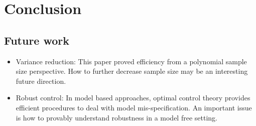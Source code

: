 \section{Conclusion}
\label{section:conclusion}
\subsection{Future work}
\begin{itemize}
    \item Variance reduction: This paper proved efficiency from a polynomial sample size perspective. How to further decrease sample size may be an interesting future direction.
    \item Robust control: In model based approaches, optimal control theory provides efficient procedures to deal with model mis-specification. An important issue is how to provably understand robustness in a model free setting.
\end{itemize}

